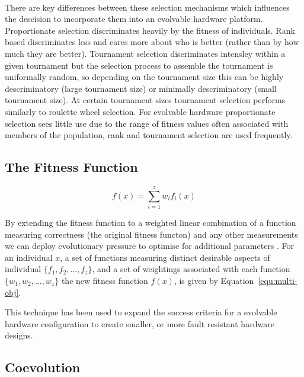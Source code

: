 \paragraph{}
There are key differences between these selection mechanisms which influences
the descision to incorporate them into an evolvable hardware platform. Proportionate
selection discriminates heavily by the fitness of individuals. Rank based
discriminates less and cares more about who is better (rather than by how
much they are better). Tournament selection discriminates intensley within a given
tournament but the selection process to assemble the tournament is uniformally
random, so depending on the tournament size this can be highly descriminatory
(large tournament size) or minimally descriminatory (small tournament size).
At certain tournament sizes tournament selection performs similarly to roulette
wheel selection.
For evolvable hardware proportionate selection sees little use due to the range
of fitness values often associated with members of the population, rank and
tournament selection are used frequently.

\subsection{The Fitness Function}

\begin{equation}
	f(x) = \sum_{i=1}^{z} w_i f_i(x)
	\label{equ:multi-obj}
\end{equation}

By extending the fitness function to a weighted linear combination of a function
measuring correctness (the original fitness functon)
and any other measurements we can deploy evolutionary pressure to optimise for
additional parameters \cite{deJong:2001:RBP:2955239.2955241}. For an individual
$x$, a set of functions measuring distinct desirable aspects of individual
$\{f_1,f_2,\ldots,f_z\}$, and a set of weightings associated with each function
$\{w_1,w_2,\ldots,w_z\}$ the new fitness function $f(x)$, is given by
Equation~\ref{equ:multi-obj}.

This technique has been used to expand the success criteria for a evolvable hardware configuration
to create smaller, or more fault resistant hardware designs.

\subsection{Coevolution}


